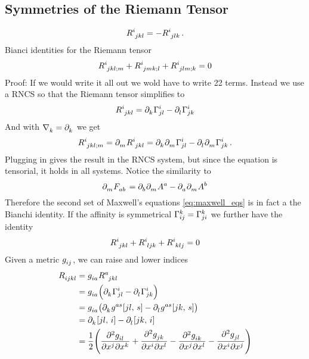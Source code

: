 \subsection{Symmetries of the Riemann Tensor}
\begin{equation}
\tensor{R}{^i_j_k_l}=-\tensor{R}{^i_j_l_k}\,.
\end{equation}
Bianci identities for the Riemann tensor
\begin{equation}
\tensor{R}{^i_j_k_l_{;m}}+\tensor{R}{^i_j_m_k_{;l}}+\tensor{R}{^i_j_l_m_{;k}}=0
\end{equation}
Proof: If we would write it all out we wold have to write 22 terms. Instead we
use a RNCS so that the Riemann tensor simplifies to 
\begin{equation}
\tensor{R}{^i_j_k_l}
=\tensor{\partial}{_k}\affin{i}{j}{l}
-\tensor{\partial}{_l}\affin{i}{j}{k}
\end{equation}
And with $\tensor{\nabla}{_k}=\tensor{\partial}{_k}$ we get
\begin{equation}
\tensor{R}{^i_j_k_l_{;m}}
=\tensor{\partial}{_m}\tensor{R}{^i_j_k_l}
=\tensor{\partial}{_k}\tensor{\partial}{_m}\affin{i}{j}{l}
-\tensor{\partial}{_l}\tensor{\partial}{_m}\affin{i}{j}{k}\,.
\end{equation}
Plugging in gives the result in the RNCS system, but since the equation is
tensorial, it holds in all systems. Notice the similarity to 
\begin{equation}
\tensor{\partial}{_m}\tensor{F}{_a_b}
=\tensor{\partial}{_b}\tensor{\partial}{_m}\tensor{A}{^a}
-\tensor{\partial}{_a}\tensor{\partial}{_m}\tensor{A}{^b}
\end{equation}
Therefore the second set of Maxwell's
equations \eqref{eq:maxwell_eqs} is in fact a the Bianchi identity.
If the affinity is symmetrical $\Gamma^{k}_{i j}=\Gamma^{k}_{j i}$ we further have
the identity
\begin{equation}
\tensor{R}{^i_j_k_l}+\tensor{R}{^i_l_j_k}+\tensor{R}{^i_k_l_j}=0
\end{equation}
Given a metric $\tensor{g}{_i_j}$, we can raise and lower
indices
\begin{equation}
\begin{split}
\tensor{R}{_i_j_k_l}
&=\tensor{g}{_i_a}\tensor{R}{^a_j_k_l}\\
&=\tensor{g}{_i_a}\left(\tensor{\partial}{_k}\affin{i}{j}{l}
-\tensor{\partial}{_l}\affin{i}{j}{k}\right)\\
&=\tensor{g}{_i_a}\left(\tensor{\partial}{_k}\tensor{g}{^a^s}\csym{j}{l}{s}
-\tensor{\partial}{_l}\tensor{g}{^a^s}\csym{j}{k}{s}\right)\\
&=\tensor{\partial}{_k}\csym{j}{l}{i}
-\tensor{\partial}{_l}\csym{j}{k}{i}\\
&=\frac{1}{2}\left(
\dmd{{\tensor{g}{_i_l}}}{2}{\tensor{x}{^j}}{}{\tensor{x}{^k}}{}
+\dmd{{\tensor{g}{_j_k}}}{2}{\tensor{x}{^i}}{}{\tensor{x}{^l}}{}
-\dmd{{\tensor{g}{_i_k}}}{2}{\tensor{x}{^j}}{}{\tensor{x}{^l}}{}
-\dmd{{\tensor{g}{_j_l}}}{2}{\tensor{x}{^i}}{}{\tensor{x}{^j}}{}\right)
\end{split}
\end{equation}
